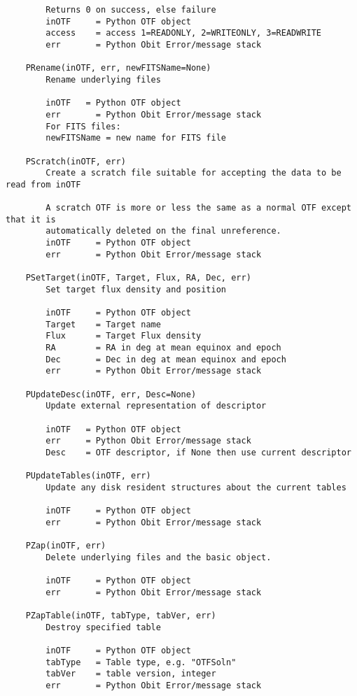 \documentclass[11pt]{report}
\begin{document}
\begin{verbatim}
        Returns 0 on success, else failure
        inOTF     = Python OTF object
        access    = access 1=READONLY, 2=WRITEONLY, 3=READWRITE
        err       = Python Obit Error/message stack
    
    PRename(inOTF, err, newFITSName=None)
        Rename underlying files
        
        inOTF   = Python OTF object
        err       = Python Obit Error/message stack
        For FITS files:
        newFITSName = new name for FITS file
    
    PScratch(inOTF, err)
        Create a scratch file suitable for accepting the data to be read from inOTF
        
        A scratch OTF is more or less the same as a normal OTF except that it is
        automatically deleted on the final unreference.
        inOTF     = Python OTF object
        err       = Python Obit Error/message stack
    
    PSetTarget(inOTF, Target, Flux, RA, Dec, err)
        Set target flux density and position
        
        inOTF     = Python OTF object
        Target    = Target name
        Flux      = Target Flux density
        RA        = RA in deg at mean equinox and epoch
        Dec       = Dec in deg at mean equinox and epoch
        err       = Python Obit Error/message stack
    
    PUpdateDesc(inOTF, err, Desc=None)
        Update external representation of descriptor
        
        inOTF   = Python OTF object
        err     = Python Obit Error/message stack
        Desc    = OTF descriptor, if None then use current descriptor
    
    PUpdateTables(inOTF, err)
        Update any disk resident structures about the current tables
        
        inOTF     = Python OTF object
        err       = Python Obit Error/message stack
    
    PZap(inOTF, err)
        Delete underlying files and the basic object.
        
        inOTF     = Python OTF object
        err       = Python Obit Error/message stack
    
    PZapTable(inOTF, tabType, tabVer, err)
        Destroy specified table
        
        inOTF     = Python OTF object
        tabType   = Table type, e.g. "OTFSoln"
        tabVer    = table version, integer
        err       = Python Obit Error/message stack
    

\end{verbatim}
\end{document}
